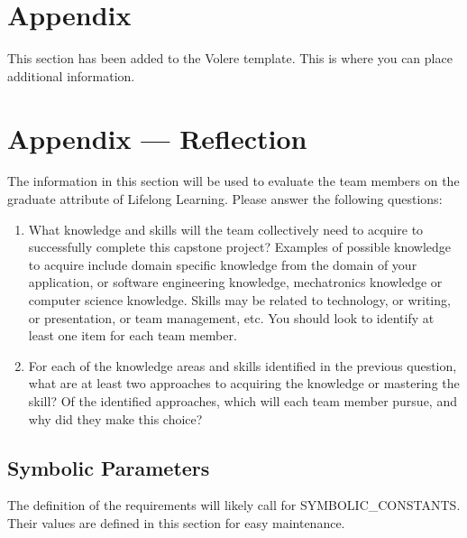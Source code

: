 \documentclass[12pt]{article}
\begin{document}
\noindent {}
\section{Appendix}

This section has been added to the Volere template. This is where you can place additional
information.

\newpage{}
\section*{Appendix --- Reflection}

The information in this section will be used to evaluate the team members on the graduate attribute
of Lifelong Learning. Please answer the following questions:

\begin{enumerate}
	\item What knowledge and skills will the team collectively need to acquire to successfully complete this
	      capstone project? Examples of possible knowledge to acquire include domain specific knowledge from
	      the domain of your application, or software engineering knowledge, mechatronics knowledge or
	      computer science knowledge. Skills may be related to technology, or writing, or presentation, or
	      team management, etc. You should look to identify at least one item for each team member.
	\item For each of the knowledge areas and skills identified in the previous question, what are at least
	      two approaches to acquiring the knowledge or mastering the skill? Of the identified approaches,
	      which will each team member pursue, and why did they make this choice?
\end{enumerate}

\subsection{Symbolic Parameters}

The definition of the requirements will likely call for SYMBOLIC\_CONSTANTS. Their values are
defined in this section for easy maintenance.
\end{document}

